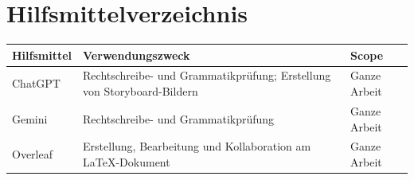 \documentclass{fhnwreport}         %
\begin{document}
\clearpage
			
\thispagestyle{empty}


\tableofcontents
\clearpage

\listoffigures
\listoftables
\cleardoublepage











{\sloppypar
\printbibliography[heading=bibintoc, title=Quellenverzeichnis]
\section*{Hilfsmittelverzeichnis}

\begin{tabular}{|p{3cm}|p{8cm}|p{3cm}|}
    \hline
    \textbf{Hilfsmittel} & \textbf{Verwendungszweck} & \textbf{Scope} \\
    \hline
    ChatGPT & Rechtschreibe- und Grammatikprüfung; Erstellung von Storyboard-Bildern & Ganze Arbeit \\
    \hline
    Gemini & Rechtschreibe- und Grammatikprüfung & Ganze Arbeit \\
    \hline
    Overleaf & Erstellung, Bearbeitung und Kollaboration am LaTeX-Dokument & Ganze Arbeit \\
    \hline
\end{tabular}


}




\end{document}
